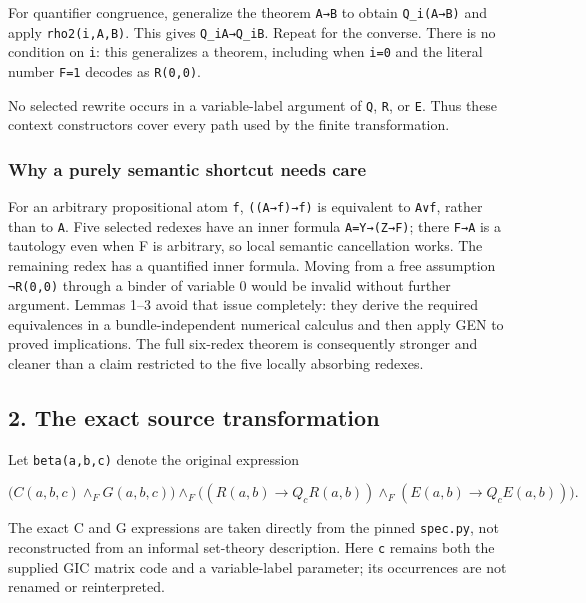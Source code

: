 For quantifier congruence, generalize the theorem \texttt{A→B} to obtain
\texttt{Q\_i(A→B)} and apply \texttt{rho2(i,A,B)}. This gives
\texttt{Q\_iA→Q\_iB}. Repeat for the converse. There is no condition on
\texttt{i}: this generalizes a theorem, including when \texttt{i=0} and
the literal number \texttt{F=1} decodes as \texttt{R(0,0)}.

No selected rewrite occurs in a variable-label argument of \texttt{Q},
\texttt{R}, or \texttt{E}. Thus these context constructors cover every
path used by the finite transformation.

\hypertarget{why-a-purely-semantic-shortcut-needs-care}{%
\subsubsection{Why a purely semantic shortcut needs
care}\label{why-a-purely-semantic-shortcut-needs-care}}

For an arbitrary propositional atom \texttt{f}, \texttt{((A→f)→f)} is
equivalent to \texttt{A∨f}, rather than to \texttt{A}. Five selected
redexes have an inner formula \texttt{A=Y→(Z→F)}; there \texttt{F→A} is
a tautology even when F is arbitrary, so local semantic cancellation
works. The remaining redex has a quantified inner formula. Moving from a
free assumption \texttt{¬R(0,0)} through a binder of variable 0 would be
invalid without further argument. Lemmas 1--3 avoid that issue
completely: they derive the required equivalences in a
bundle-independent numerical calculus and then apply GEN to proved
implications. The full six-redex theorem is consequently stronger and
cleaner than a claim restricted to the five locally absorbing redexes.

\hypertarget{the-exact-source-transformation}{%
\subsection{2. The exact source
transformation}\label{the-exact-source-transformation}}

Let \texttt{beta(a,b,c)} denote the original expression

\[
\bigl(C(a,b,c)\wedge_F G(a,b,c)\bigr)
\wedge_F
\bigl((R(a,b)\to Q_cR(a,b))\wedge_F(E(a,b)\to Q_cE(a,b))\bigr).
\]

The exact C and G expressions are taken directly from the pinned
\texttt{spec.py}, not reconstructed from an informal set-theory
description. Here \texttt{c} remains both the supplied GIC matrix code
and a variable-label parameter; its occurrences are not renamed or
reinterpreted.

